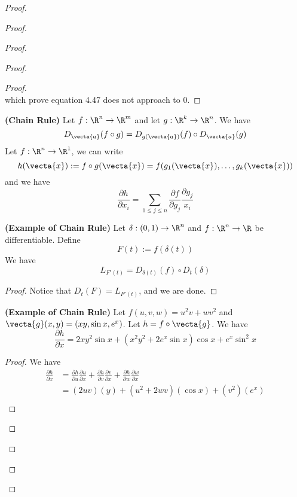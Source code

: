 \documentclass{report}
\begin{document}
\begin{proof}
\begin{proof}
\begin{proof}
\begin{proof}
\begin{proof}
\begin{equation}
\end{equation}
which prove  equation 4.47 does not approach to 0.
\end{proof}
\begin{theorem}
\label{8.3.4}
\textbf{(Chain Rule)} Let $f:\R^n\rightarrow \R^m$ and let $g:\R^k\rightarrow \R^n$. We have
\begin{equation}
D_\vecta{a}(f\circ g)=D_{g(\vecta{a})}(f)\circ D_\vecta{a}(g)
\end{equation}
Let $f:\R^n\rightarrow \R^1$, we can write 
\begin{equation}
h(\vecta{x}):=f\circ g(\vecta{x})=f(g_1(\vecta{x}),\dots, g_k(\vecta{x}))
\end{equation}
and we have
\begin{equation}
\frac{\partial h}{\partial x_i}=\sum_{1\leq j\leq n}\frac{\partial f}{\partial g_j}\frac{\partial g_j}{x_i}
\end{equation}
\end{theorem}
\begin{theorem}
\label{8.3.5}
\textbf{(Example of Chain Rule)} Let $\delta:(0,1)\rightarrow \R^n$ and $f:\R^n\rightarrow \R$ be differentiable. Define
\begin{equation}
F(t):=f(\delta (t))
\end{equation}
We have
\begin{equation}
L_{F'(t)}=D_{\delta (t)}(f)\circ D_{t}(\delta)
\end{equation}
\end{theorem}
\begin{proof}
Notice that $D_t(F)=L_{F'(t)}$, and we are done.
\end{proof}
\begin{theorem}
\label{8.3.6}
\textbf{(Example of Chain Rule)} Let $f(u,v,w)=u^2v+wv^2$ and $\vecta{g}(x,y)=(xy,\sin x,e^x)$. Let $h=f\circ \vecta{g}$. We have
\begin{equation}
\frac{\partial h}{\partial x}=2xy^2\sin x+(x^2y^2+2e^x\sin x) \cos x+ e^x\sin^2 x
\end{equation}
\end{theorem}
\begin{proof}
We have
\begin{align}
  \frac{\partial h}{\partial x}&=\frac{\partial h}{\partial u}\frac{\partial u}{\partial x}+\frac{\partial h}{\partial v}\frac{\partial v}{\partial x}+\frac{\partial h}{\partial w}\frac{\partial w}{\partial x}\\
  &=(2uv)(y)+(u^2+2wv)(\cos x)+(v^2)(e^x)\\

\end{align}
\end{proof}
\end{proof}
\end{proof}
\end{proof}
\end{proof}
\end{document}
